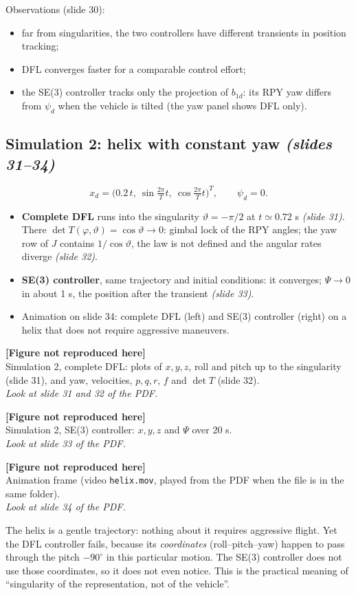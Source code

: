 \documentclass[11pt,a4paper]{article}
\newcommand{\sli}[1]{\emph{(#1)}}
\theoremstyle{definition}
\theoremstyle{plain}
\theoremstyle{remark}
\newcommand{\placeholder}[2]{%
  \begin{center}
  \begin{tcolorbox}[enhanced,width=0.92\textwidth,colback=gray!4,colframe=black!40,
    boxrule=0.6pt,borderline={0.6pt}{0pt}{black!40,dashed},halign=center,valign=center,height=4.2cm]
  \textbf{[Figure not reproduced here]}\\[2pt] #1\\[2pt]
  \emph{Look at slide #2 of the PDF.}
  \end{tcolorbox}
  \end{center}}
\begin{document}
Observations (slide 30):
\begin{itemize}
  \item far from singularities, the two controllers have different transients in position tracking;
  \item DFL converges faster for a comparable control effort;
  \item the SE(3) controller tracks only the projection of $b_{1d}$: its RPY yaw differs from $\psi_d$ when the vehicle is tilted (the yaw panel shows DFL only).
\end{itemize}

\subsection{Simulation 2: helix with constant yaw \sli{slides 31--34}}

\[
x_d=\Big(0.2\,t,\ \sin\tfrac{2\pi}Tt,\ \cos\tfrac{2\pi}Tt\Big)^T,\qquad\psi_d=0 .
\]

\begin{itemize}
  \item \textbf{Complete DFL} runs into the singularity $\vartheta=-\pi/2$ at $t\simeq0.72$ s \sli{slide 31}. There $\det T(\varphi,\vartheta)=\cos\vartheta\to0$: gimbal lock of the RPY angles; the yaw row of $J$ contains $1/\cos\vartheta$, the law is not defined and the angular rates diverge \sli{slide 32}.
  \item \textbf{SE(3) controller}, same trajectory and initial conditions: it converges; $\Psi\to0$ in about 1 s, the position after the transient \sli{slide 33}.
  \item Animation on slide 34: complete DFL (left) and SE(3) controller (right) on a helix that does not require aggressive maneuvers.
\end{itemize}

\placeholder{Simulation 2, complete DFL: plots of $x,y,z$, roll and pitch up to the singularity (slide 31), and yaw, velocities, $p,q,r$, $f$ and $\det T$ (slide 32).}{31 and 32}
\placeholder{Simulation 2, SE(3) controller: $x,y,z$ and $\Psi$ over 20 s.}{33}
\placeholder{Animation frame (video \texttt{helix.mov}, played from the PDF when the file is in the same folder).}{34}

\begin{intuition}
The helix is a gentle trajectory: nothing about it requires aggressive flight. Yet the DFL controller fails, because its \emph{coordinates} (roll--pitch--yaw) happen to pass through the pitch $-90^\circ$ in this particular motion. The SE(3) controller does not use those coordinates, so it does not even notice. This is the practical meaning of ``singularity of the representation, not of the vehicle''.
\end{intuition}
\end{document}
